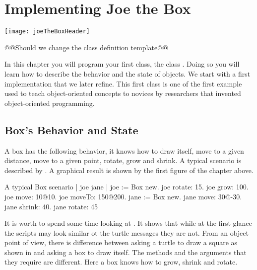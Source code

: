 \ifx\wholebook\relax\else



\fi



\chapter{Implementing Joe the Box}\label{ch:Joe}

\begin{chapterfigure}
\texttt{[image: joeTheBoxHeader]}
\end{chapterfigure}

@@Should we change the class definition template@@



In this chapter you will program your first class, the class . 
Doing so you will learn how to describe the behavior and the state of
objects.  We start with a first implementation that we later refine. 
This first class is one of the first example used to teach
object-oriented concepts to novices by researchers that invented
object-oriented programming.

\section{Box's Behavior and State}\label{sec:firstimplementation}

A box has the following behavior, it knows how to draw itself, move to
a given distance, move to a given point, rotate, grow and shrink.  A
typical scenario is described by .  A graphical
result is shown by the first figure of the chapter above.

\begin{scriptwithtitle}{A typical Box scenario}\label{scr:scenario}
| joe jane |
joe := Box new.
joe rotate: 15.
joe grow: 100.
joe move: 10@10.
joe moveTo: 150@200. 
jane := Box new.
jane move: 30@-30.
jane shrink: 40.
jane rotate: 45
\end{scriptwithtitle}
    
It is worth to spend some time looking at .  It
shows that while at the first glance the scripts may look similar ot the turtle messages they
are not.  From an object point of view, there is difference between
asking a turtle to draw a square as shown in  and asking
a box to draw itself.  The methods and the arguments that they require
are different.  Here a box knows how to grow, shrink and rotate.

